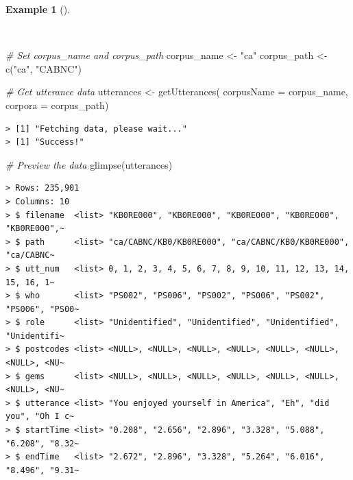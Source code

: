\documentclass[
  letterpaper,
  DIV=11,
  numbers=noendperiod]{scrreport}
\newenvironment{Shaded}{\begin{snugshade}}{\end{snugshade}}
\newcommand{\AttributeTok}[1]{\textcolor[rgb]{0.00,0.00,0.00}{#1}}
\newcommand{\CommentTok}[1]{\textcolor[rgb]{0.00,0.00,0.00}{\textit{#1}}}
\newcommand{\FunctionTok}[1]{\textcolor[rgb]{0.00,0.00,0.00}{#1}}
\newcommand{\NormalTok}[1]{\textcolor[rgb]{0.00,0.00,0.00}{#1}}
\newcommand{\OtherTok}[1]{\textcolor[rgb]{0.00,0.00,0.00}{#1}}
\newcommand{\StringTok}[1]{\textcolor[rgb]{0.00,0.00,0.00}{#1}}
\theoremstyle{definition}
\newtheorem{example}{Example}[chapter]
\theoremstyle{remark}
\begin{document}
\begin{example}[]\protect\hypertarget{exm-ad-get-utterances}{}\label{exm-ad-get-utterances}

~

\begin{Shaded}
\begin{Highlighting}[]
\CommentTok{\# Set corpus\_name and corpus\_path}
\NormalTok{corpus\_name }\OtherTok{\textless{}{-}} \StringTok{"ca"}
\NormalTok{corpus\_path }\OtherTok{\textless{}{-}} \FunctionTok{c}\NormalTok{(}\StringTok{"ca"}\NormalTok{, }\StringTok{"CABNC"}\NormalTok{)}

\CommentTok{\# Get utterance data}
\NormalTok{utterances }\OtherTok{\textless{}{-}} 
  \FunctionTok{getUtterances}\NormalTok{(}
    \AttributeTok{corpusName =}\NormalTok{ corpus\_name, }
    \AttributeTok{corpora =}\NormalTok{ corpus\_path)}
\end{Highlighting}
\end{Shaded}

\begin{verbatim}
> [1] "Fetching data, please wait..."
> [1] "Success!"
\end{verbatim}

\begin{Shaded}
\begin{Highlighting}[]
\CommentTok{\# Preview the data}
\FunctionTok{glimpse}\NormalTok{(utterances)}
\end{Highlighting}
\end{Shaded}

\begin{verbatim}
> Rows: 235,901
> Columns: 10
> $ filename  <list> "KB0RE000", "KB0RE000", "KB0RE000", "KB0RE000", "KB0RE000",~
> $ path      <list> "ca/CABNC/KB0/KB0RE000", "ca/CABNC/KB0/KB0RE000", "ca/CABNC~
> $ utt_num   <list> 0, 1, 2, 3, 4, 5, 6, 7, 8, 9, 10, 11, 12, 13, 14, 15, 16, 1~
> $ who       <list> "PS002", "PS006", "PS002", "PS006", "PS002", "PS006", "PS00~
> $ role      <list> "Unidentified", "Unidentified", "Unidentified", "Unidentifi~
> $ postcodes <list> <NULL>, <NULL>, <NULL>, <NULL>, <NULL>, <NULL>, <NULL>, <NU~
> $ gems      <list> <NULL>, <NULL>, <NULL>, <NULL>, <NULL>, <NULL>, <NULL>, <NU~
> $ utterance <list> "You enjoyed yourself in America", "Eh", "did you", "Oh I c~
> $ startTime <list> "0.208", "2.656", "2.896", "3.328", "5.088", "6.208", "8.32~
> $ endTime   <list> "2.672", "2.896", "3.328", "5.264", "6.016", "8.496", "9.31~
\end{verbatim}

\end{example}
\end{document}
